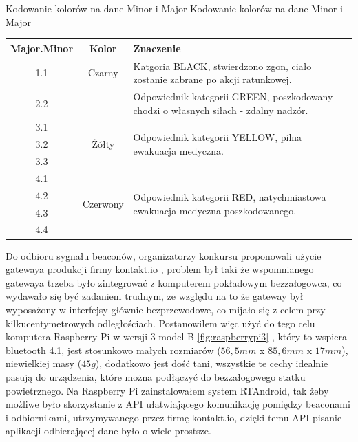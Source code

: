 \begin{tablica}
    {Kodowanie kolorów na dane Minor i Major}
    {Kodowanie kolorów na dane Minor i Major}
    {
    \begin{tabular}{|c|c|p{10cm}|} \hline
	    \textbf{Major.Minor} & \textbf{Kolor} & \textbf{Znaczenie} \\ \hline
	    \multirow{2}{*}{1.1} & \multirow{2}{1.65cm}{Czarny} & Katgoria BLACK, stwierdzono zgon, ciało zostanie zabrane po akcji ratunkowej. \\ \hline
	    2.1 & \multirow{2}{1.65cm}{Zielony} & \multirow{2}{10cm}{Odpowiednik kategorii GREEN, poszkodowany chodzi o własnych siłach - zdalny nadzór.} \\
	2.2 & &  \\ \hline
	    3.1 & \multirow{3}{1.65cm}{Żółty} & \multirow{3}{10cm}{Odpowiednik kategorii YELLOW, pilna ewakuacja medyczna.} \\
	3.2 & &  \\
	3.3 & &  \\ \hline
	    4.1 & \multirow{4}{1.65cm}{Czerwony} & \multirow{4}{10cm}{Odpowiednik kategorii RED, natychmiastowa ewakuacja medyczna poszkodowanego.} \\
	4.2 & &  \\
	4.3 & &  \\
	4.4 & &  \\ \hline
    \end{tabular}
    }
    \label{tab:minormajor}
\end{tablica}

Do odbioru sygnału beaconów, organizatorzy konkursu proponowali użycie gatewaya produkcji firmy kontakt.io \cite{gateway}, problem był taki że wspomnianego gatewaya trzeba było zintegrować z komputerem pokładowym bezzałogowca, co wydawało się być zadaniem trudnym, ze względu na to że gateway był wyposażony w interfejsy głównie bezprzewodowe, co mijało się z celem przy kilkucentymetrowych odległościach. Postanowiłem więc użyć do tego celu komputera Raspberry Pi w wersji 3 model B \ref{fig:raspberrypi3} \cite{raspberrypimodelscomparison}, który to wspiera bluetooth 4.1, jest stosunkowo małych rozmiarów ($56,5 mm$ x $85,6 mm$ x $17 mm$), niewielkiej masy ($45g$), dodatkowo jest dość tani, wszystkie te cechy idealnie pasują do urządzenia, które można podłączyć do bezzałogowego statku powietrznego. Na Raspberry Pi zainstalowałem system RTAndroid\cite{rtandroid}, tak żeby możliwe było skorzystanie z API ułatwiającego komunikację pomiędzy beaconami i odbiornikami, utrzymywanego przez firmę kontakt.io, dzięki temu API pisanie aplikacji odbierającej dane było o wiele prostsze.

